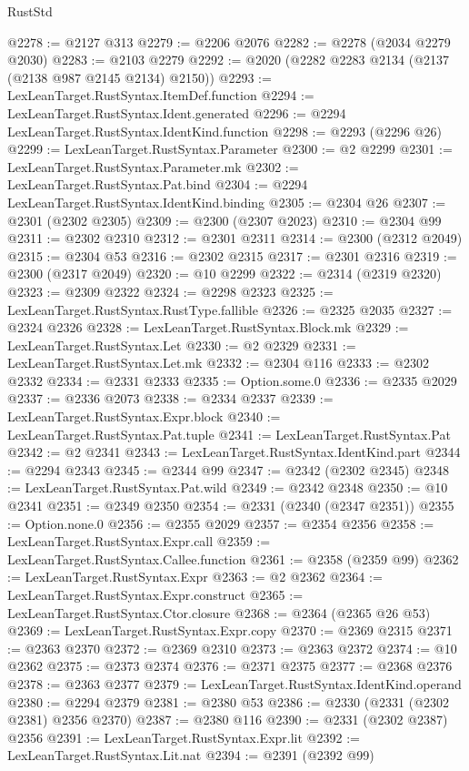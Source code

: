 \begin{lexlean}{RustStd}
\begin{coremodule}
@2278 := @2127 @313
@2279 := @2206 @2076
@2282 := @2278 (@2034 @2279 @2030)
@2283 := @2103 @2279
@2292 := @2020 (@2282 @2283 @2134 (@2137 (@2138 @987 @2145 @2134) @2150))
@2293 := LexLeanTarget.RustSyntax.ItemDef.function
@2294 := LexLeanTarget.RustSyntax.Ident.generated
@2296 := @2294 LexLeanTarget.RustSyntax.IdentKind.function
@2298 := @2293 (@2296 @26)
@2299 := LexLeanTarget.RustSyntax.Parameter
@2300 := @2 @2299
@2301 := LexLeanTarget.RustSyntax.Parameter.mk
@2302 := LexLeanTarget.RustSyntax.Pat.bind
@2304 := @2294 LexLeanTarget.RustSyntax.IdentKind.binding
@2305 := @2304 @26
@2307 := @2301 (@2302 @2305)
@2309 := @2300 (@2307 @2023)
@2310 := @2304 @99
@2311 := @2302 @2310
@2312 := @2301 @2311
@2314 := @2300 (@2312 @2049)
@2315 := @2304 @53
@2316 := @2302 @2315
@2317 := @2301 @2316
@2319 := @2300 (@2317 @2049)
@2320 := @10 @2299
@2322 := @2314 (@2319 @2320)
@2323 := @2309 @2322
@2324 := @2298 @2323
@2325 := LexLeanTarget.RustSyntax.RustType.fallible
@2326 := @2325 @2035
@2327 := @2324 @2326
@2328 := LexLeanTarget.RustSyntax.Block.mk
@2329 := LexLeanTarget.RustSyntax.Let
@2330 := @2 @2329
@2331 := LexLeanTarget.RustSyntax.Let.mk
@2332 := @2304 @116
@2333 := @2302 @2332
@2334 := @2331 @2333
@2335 := Option.some.{0}
@2336 := @2335 @2029
@2337 := @2336 @2073
@2338 := @2334 @2337
@2339 := LexLeanTarget.RustSyntax.Expr.block
@2340 := LexLeanTarget.RustSyntax.Pat.tuple
@2341 := LexLeanTarget.RustSyntax.Pat
@2342 := @2 @2341
@2343 := LexLeanTarget.RustSyntax.IdentKind.part
@2344 := @2294 @2343
@2345 := @2344 @99
@2347 := @2342 (@2302 @2345)
@2348 := LexLeanTarget.RustSyntax.Pat.wild
@2349 := @2342 @2348
@2350 := @10 @2341
@2351 := @2349 @2350
@2354 := @2331 (@2340 (@2347 @2351))
@2355 := Option.none.{0}
@2356 := @2355 @2029
@2357 := @2354 @2356
@2358 := LexLeanTarget.RustSyntax.Expr.call
@2359 := LexLeanTarget.RustSyntax.Callee.function
@2361 := @2358 (@2359 @99)
@2362 := LexLeanTarget.RustSyntax.Expr
@2363 := @2 @2362
@2364 := LexLeanTarget.RustSyntax.Expr.construct
@2365 := LexLeanTarget.RustSyntax.Ctor.closure
@2368 := @2364 (@2365 @26 @53)
@2369 := LexLeanTarget.RustSyntax.Expr.copy
@2370 := @2369 @2315
@2371 := @2363 @2370
@2372 := @2369 @2310
@2373 := @2363 @2372
@2374 := @10 @2362
@2375 := @2373 @2374
@2376 := @2371 @2375
@2377 := @2368 @2376
@2378 := @2363 @2377
@2379 := LexLeanTarget.RustSyntax.IdentKind.operand
@2380 := @2294 @2379
@2381 := @2380 @53
@2386 := @2330 (@2331 (@2302 @2381) @2356 @2370)
@2387 := @2380 @116
@2390 := @2331 (@2302 @2387) @2356
@2391 := LexLeanTarget.RustSyntax.Expr.lit
@2392 := LexLeanTarget.RustSyntax.Lit.nat
@2394 := @2391 (@2392 @99)

\end{coremodule}
\end{lexlean}
